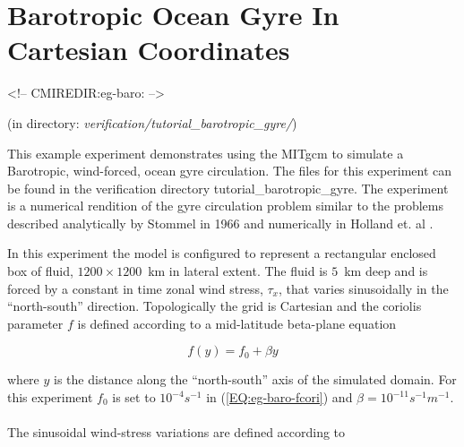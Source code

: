 

%
%

\section[Barotropic Gyre MITgcm Example]{Barotropic Ocean Gyre In Cartesian Coordinates}
\label{www:tutorials}
\label{sect:eg-baro}
\begin{rawhtml}
<!-- CMIREDIR:eg-baro: -->
\end{rawhtml}
\begin{center} 
(in directory: {\it verification/tutorial\_barotropic\_gyre/})
\end{center}

This example experiment demonstrates using the MITgcm to simulate
a Barotropic, wind-forced, ocean gyre circulation. The files for this
experiment can be found in the verification directory tutorial\_barotropic\_gyre.
The experiment is a numerical rendition of the gyre circulation problem similar
to the problems described analytically by Stommel in 1966 
\cite{Stommel66} and numerically in Holland et. al \cite{Holland75}.

In this experiment the model 
is configured to represent a rectangular enclosed box of fluid,
$1200 \times 1200 $~km in lateral extent. The fluid is $5$~km deep and is forced
by a constant in time zonal wind stress, $\tau_x$, that varies sinusoidally
in the ``north-south'' direction. Topologically the grid is Cartesian and 
the coriolis parameter $f$ is defined according to a mid-latitude beta-plane 
equation

\begin{equation}
\label{EQ:eg-baro-fcori}
f(y) = f_{0}+\beta y
\end{equation}
 
\noindent where $y$ is the distance along the ``north-south'' axis of the 
simulated domain. For this experiment $f_{0}$ is set to $10^{-4}s^{-1}$ in 
(\ref{EQ:eg-baro-fcori}) and $\beta = 10^{-11}s^{-1}m^{-1}$. 
\\
\\
 The sinusoidal wind-stress variations are defined according to 

